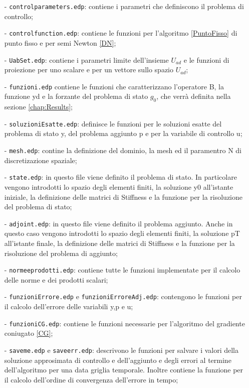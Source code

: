 \begin{itemize}
\item[-] \texttt{controlparameters.edp}: contiene i parametri che definiscono il problema di controllo;
\item[-] \texttt{controlfunction.edp}: contiene le funzioni per l'algoritmo \ref{PuntoFisso} di punto fisso e per semi Newton \ref{DN};
\item[-] \texttt{UabSet.edp}: contiene i parametri limite dell'insieme $U_{ad}$ e le funzioni di proiezione per uno scalare e per un vettore sullo spazio $U_{ad}$;
\item[-] \texttt{funzioni.edp} contiene le funzioni che caratterizzano l'operatore B, la funzione yd e la forzante del problema di stato $g_0$, che verrà definita nella sezione \ref{chap:Results};
\item[-] \texttt{soluzioniEsatte.edp}: definisce le funzioni per le soluzioni esatte del problema di stato y, del problema aggiunto p e per la variabile di controllo u;
\item[-] \texttt{mesh.edp}: contine la definizione del dominio, la mesh ed il paramentro N di discretizazione spaziale;
\item[-] \texttt{state.edp}: in questo file viene definito il problema di stato. In particolare vengono introdotti lo spazio degli elementi finiti, la soluzione y0 all'istante iniziale, la definizione delle matrici di Stiffness e la funzione per la risoluzione del problema di stato;
\item[-] \texttt{adjoint.edp}: in questo file viene definito il problema aggiunto. Anche in questo caso vengono introdotti lo spazio degli elementi finiti, la soluzione pT all'istante finale, la definizione delle matrici di Stiffness e la funzione per la risoluzione del problema di aggiunto; 
\item[-] \texttt{normeeprodotti.edp}: contiene tutte le funzioni implementate per il calcolo delle norme e dei prodotti scalari; 
\item[-] \texttt{funzioniErrore.edp} e \texttt{funzioniErroreAdj.edp}: contengono le funzioni per il calcolo dell'errore delle variabili y,p e u;
\item[-] \texttt{funzioniCG.edp}: contiene le funzioni necessarie per l'algoritmo del gradiente coniugato \ref{CG}; 
\item[-] \texttt{saveme.edp} e \texttt{saveerr.edp}: descrivono le funzioni per salvare i valori della soluzione approsimata di controllo e dell'aggiunto e degli errori al termine dell'algoritmo per una data griglia temporale. Inoltre contiene la funzione per il calcolo dell'ordine di convergenza dell'errore in tempo;
\end{itemize}
